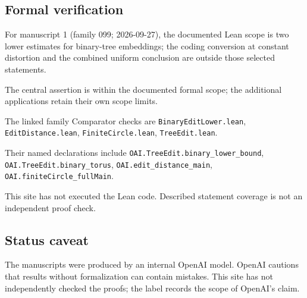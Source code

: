 \documentclass[11pt]{article}
\begin{document}
\subsection{Formal verification}
For manuscript 1 (family 099; 2026-09-27), the documented Lean scope is two lower estimates for binary-tree embeddings; the coding conversion at constant distortion and the combined uniform conclusion are outside those selected statements.

The central assertion is within the documented formal scope; the additional applications retain their own scope limits.

The linked family Comparator checks are \texttt{BinaryEditLower.lean}, \texttt{EditDistance.lean}, \texttt{FiniteCircle.lean}, \texttt{TreeEdit.lean}.

Their named declarations include \texttt{OAI.TreeEdit.binary\_lower\_bound}, \texttt{OAI.TreeEdit.binary\_torus}, \texttt{OAI.edit\_distance\_main}, \texttt{OAI.finiteCircle\_fullMain}.

This site has not executed the Lean code. Described statement coverage is not an independent proof check.

\subsection{Status caveat}
The manuscripts were produced by an internal OpenAI model. OpenAI cautions that results without formalization can contain mistakes. This site has not independently checked the proofs; the label records the scope of OpenAI's claim.
\end{document}
